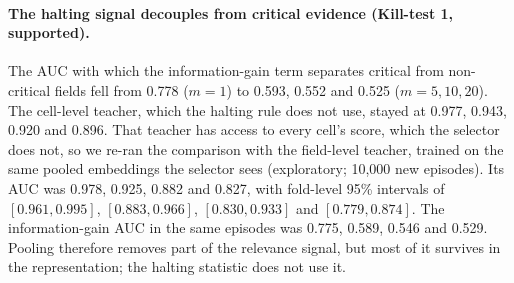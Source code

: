 \documentclass[11pt]{article}
\theoremstyle{remark}
\theoremstyle{definition}
\begin{document}
\paragraph{The halting signal decouples from critical evidence (Kill-test 1, supported).} The AUC with which the information-gain term separates critical from non-critical fields fell from 0.778 ($m=1$) to 0.593, 0.552 and 0.525 ($m=5,10,20$). The cell-level teacher, which the halting rule does not use, stayed at 0.977, 0.943, 0.920 and 0.896. That teacher has access to every cell's score, which the selector does not, so we re-ran the comparison with the field-level teacher, trained on the same pooled embeddings the selector sees (exploratory; 10,000 new episodes). Its AUC was 0.978, 0.925, 0.882 and 0.827, with fold-level 95\% intervals of $[0.961,0.995]$, $[0.883,0.966]$, $[0.830,0.933]$ and $[0.779,0.874]$. The information-gain AUC in the same episodes was 0.775, 0.589, 0.546 and 0.529. Pooling therefore removes part of the relevance signal, but most of it survives in the representation; the halting statistic does not use it.
\end{document}
